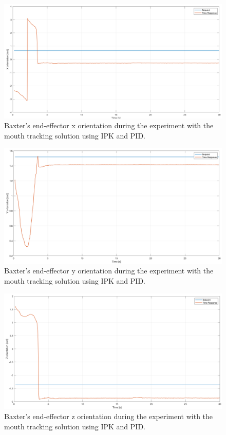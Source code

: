 \documentclass[11pt]{report} %
\begin{document}
\begin{figure}[H]
    \centering
    \includegraphics[width=1.0\linewidth]{assets/imgs/control_theory/pid_tests/x_orientation.png}
    \caption{Baxter's end-effector x orientation during the experiment with the mouth tracking solution using IPK and PID.} 
    \label{fig_baxter_x_orientation_pid_experiments}
\end{figure}

\begin{figure}[H]
    \centering
    \includegraphics[width=1.0\linewidth]{assets/imgs/control_theory/pid_tests/y_orientation.png}
    \caption{Baxter's end-effector y orientation during the experiment with the mouth tracking solution using IPK and PID.} 
    \label{fig_baxter_y_orientation_pid_experiments}
\end{figure}

\begin{figure}[H]
    \centering
    \includegraphics[width=1.0\linewidth]{assets/imgs/control_theory/pid_tests/z_orientation.png}
    \caption{Baxter's end-effector z orientation during the experiment with the mouth tracking solution using IPK and PID.} 
    \label{fig_baxter_z_orientation_pid_experiments}
\end{figure}
\end{document}
